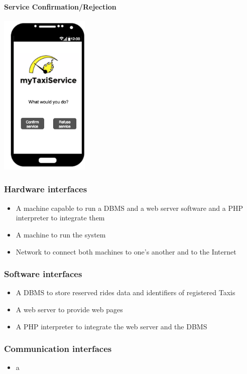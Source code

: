 		\paragraph{Service Confirmation/Rejection}
		\begin{center}
		    \includegraphics[width=0.32\textwidth]{./images/TELEFONO7}
		\end{center}
		
		\subsubsection{Hardware interfaces}
		\begin{itemize}
			\item A machine capable to run a DBMS and a web server software and a PHP interpreter to integrate them
			\item A machine to run the system
			\item Network to connect both machines to one's another and to the Internet
		\end{itemize}
		\subsubsection{Software interfaces}
		\begin{itemize}
			\item A DBMS to store reserved rides data and identifiers of registered Taxis
			\item A web server to provide web pages
			\item A PHP interpreter to integrate the web server and the DBMS
		\end{itemize}
		\subsubsection{Communication interfaces}
		\begin{itemize}
			\item a 
		\end{itemize}
